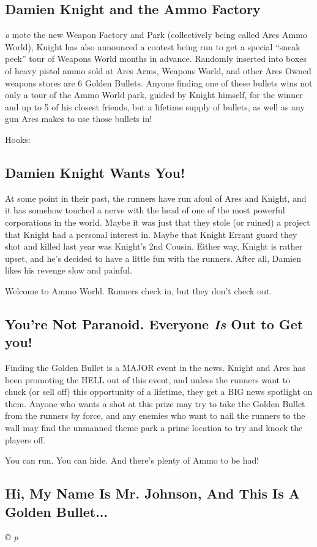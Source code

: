 \documentclass[letterpaper,onecolumn,10pt]{article}
\renewcommand{\textsc}[1]{{\fontspec{Friz Quadrata SC TT}\selectfont #1}}
\newcommand{\getyear}[1]{\StrLeft{#1}{4}}
\newenvironment{scenario}[6]
	{
		\section[#1 {\small\textsc{[#2]}}]{#1} \nopagebreak

		\noindent{\textsc{#2}}\nopagebreak

		\noindent\textit{#3}\nopagebreak
		\def\TMPSCENARIO{{\small\textit{©\getyear{#5}{} #4}}}
	}
	{\TMPSCENARIO}
\begin{document}
\begin{multicols}{2}
\begin{scenario}{Damien Knight and the Ammo Factory}
To promote the new Weapon Factory and Park (collectively being called Ares Ammo World), Knight has also announced a contest being run to get a special ``sneak peek'' tour of Weapons World months in advance. Randomly inserted into boxes of heavy pistol ammo sold at Ares Arms, Weapons World, and other Ares Owned weapons stores are 6 Golden Bullets. Anyone finding one of these bullets wins not only a tour of the Ammo World park, guided by Knight himself, for the winner and up to 5 of his closest friends, but a lifetime supply of bullets, as well as any gun Ares makes to use those bullets in!

Hooks:

\subsection{Damien Knight Wants You!}

At some point in their past, the runners have run afoul of Ares and Knight, and it has somehow touched a nerve with the head of one of the most powerful corporations in the world. Maybe it was just that they stole (or ruined) a project that Knight had a personal interest in. Maybe that Knight Errant guard they shot and killed last year was Knight's 2nd Cousin. Either way, Knight is rather upset, and he's decided to have a little fun with the runners. After all, Damien likes his revenge slow and painful.

Welcome to Ammo World. Runners check in, but they don't check out.

\subsection{You're Not Paranoid. Everyone \textit{Is} Out to Get you!}

Finding the Golden Bullet is a MAJOR event in the news. Knight and Ares has been promoting the HELL out of this event, and unless the runners want to chuck (or sell off) this opportunity of a lifetime, they get a BIG news spotlight on them. Anyone who wants a shot at this prize may try to take the Golden Bullet from the runners by force, and any enemies who want to nail the runners to the wall may find the unmanned theme park a prime location to try and knock the players off.

You can run. You can hide. And there's plenty of Ammo to be had!

\subsection{Hi, My Name Is Mr. Johnson, And This Is A Golden Bullet...}


\end{scenario}
\end{multicols}
\end{document}
